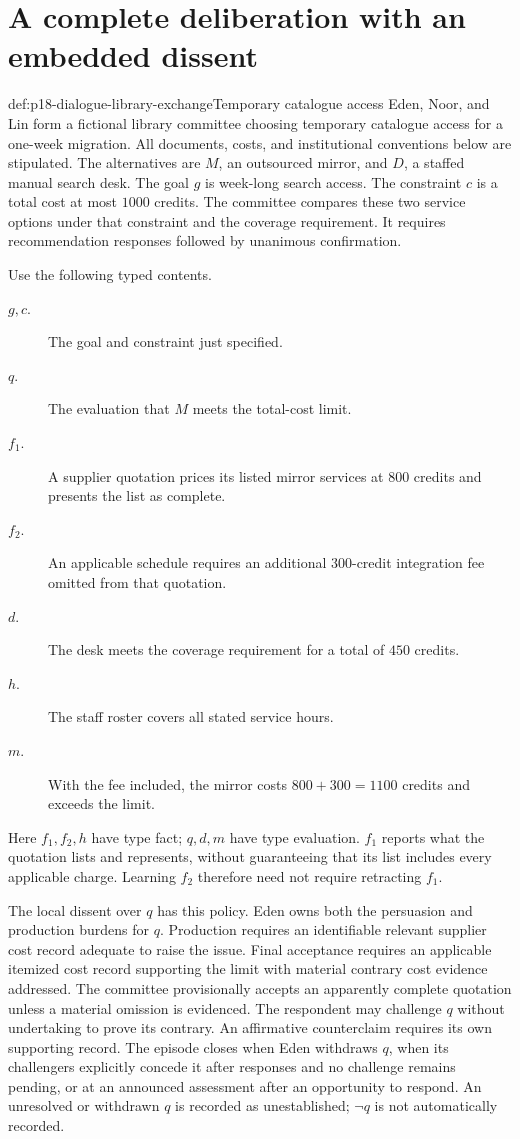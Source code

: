 \section{A complete deliberation with an embedded dissent}
\label{sec:p18-dialogue-worked}

\begin{hbexample}{def:p18-dialogue-library-exchange}{Temporary catalogue access}
Eden, Noor, and Lin form a fictional library committee choosing
temporary catalogue access for a one-week migration. All documents,
costs, and institutional conventions below are stipulated.
The alternatives are \(M\), an outsourced mirror, and \(D\), a staffed
manual search desk. The goal \(g\) is week-long search access.
The constraint \(c\) is a total cost at most \(1000\) credits.
The committee compares these two service options under that constraint
and the coverage requirement. It requires recommendation responses
followed by unanimous confirmation.

Use the following typed contents.
\begin{description}
\item[\(g,c\).] The goal and constraint just specified.
\item[\(q\).] The evaluation that \(M\) meets the total-cost limit.
\item[\(f_1\).] A supplier quotation prices its listed mirror services
at \(800\) credits and presents the list as complete.
\item[\(f_2\).] An applicable schedule requires an additional
\(300\)-credit integration fee omitted from that quotation.
\item[\(d\).] The desk meets the coverage requirement for a total
of \(450\) credits.
\item[\(h\).] The staff roster covers all stated service hours.
\item[\(m\).] With the fee included, the mirror costs
\(800+300=1100\) credits and exceeds the limit.
\end{description}
Here \(f_1,f_2,h\) have type fact; \(q,d,m\) have type evaluation.
\(f_1\) reports what the quotation lists and represents, without
guaranteeing that its list includes every applicable charge.
Learning \(f_2\) therefore need not require retracting \(f_1\).

The local dissent over \(q\) has this policy. Eden owns both the
persuasion and production burdens for \(q\).
Production requires an identifiable relevant supplier
cost record adequate to raise the issue. Final acceptance requires
an applicable itemized cost record supporting the limit with material
contrary cost evidence addressed. The committee provisionally accepts
an apparently complete quotation unless a material omission is evidenced.
The respondent may challenge \(q\) without undertaking to prove its
contrary. An affirmative counterclaim requires its own supporting record.
The episode closes when Eden withdraws \(q\), when its challengers
explicitly concede it after responses and no challenge remains pending,
or at an announced assessment after an opportunity to respond.
An unresolved or withdrawn \(q\) is recorded as unestablished;
\(\neg q\) is not automatically recorded.


\end{hbexample}
